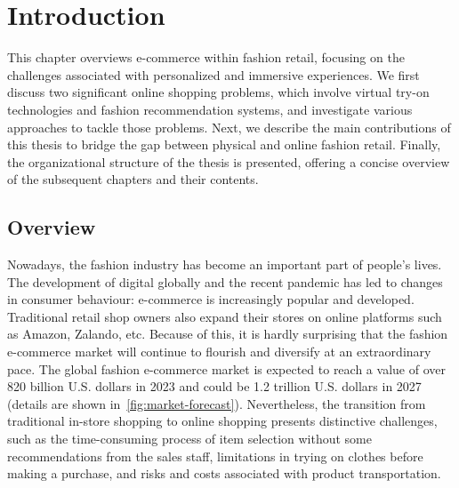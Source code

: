 \chapter{Introduction}
\label{chapter-introduction}
\begin{ChapAbstract}
This chapter overviews e-commerce within fashion retail, focusing on the challenges associated with personalized and immersive experiences. We first discuss two significant online shopping problems, which involve virtual try-on technologies and fashion recommendation systems, and investigate various approaches to tackle those problems. Next, we describe the main contributions of this thesis to bridge the gap between physical and online fashion retail. Finally, the organizational structure of the thesis is presented, offering a concise overview of the subsequent chapters and their contents.
\end{ChapAbstract}

\section{Overview}
Nowadays, the fashion industry has become an important part of people's lives. The development of digital globally and the recent pandemic has led to changes in consumer behaviour: e-commerce is increasingly popular and developed. Traditional retail shop owners also expand their stores on online platforms such as Amazon, Zalando, etc. Because of this, it is hardly surprising that the fashion e-commerce market will continue to flourish and diversify at an extraordinary pace. The global fashion e-commerce market is expected to reach a value of over 820 billion U.S. dollars in 2023 and could be 1.2 trillion U.S. dollars in 2027~\cite{Fashion2327-Statista2023} (details are shown in~\autoref{fig:market-forecast}). Nevertheless, the transition from traditional in-store shopping to online shopping presents distinctive challenges, such as the time-consuming process of item selection without some recommendations from the sales staff, limitations in trying on clothes before making a purchase, and risks and costs associated with product transportation.

